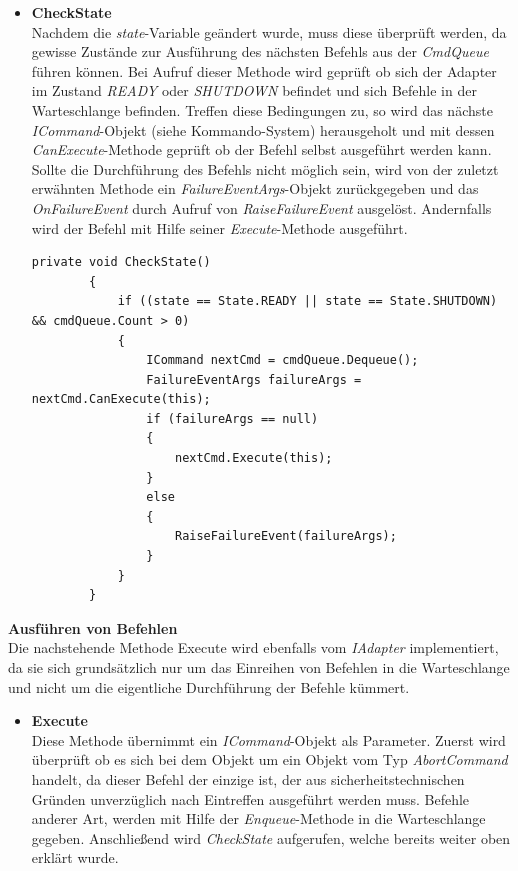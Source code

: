 \begin{itemize}
\item \textbf{CheckState}\\
Nachdem die \textit{state}-Variable geändert wurde, muss diese überprüft werden, da gewisse Zustände zur Ausführung des nächsten Befehls aus der \textit{CmdQueue} führen können. Bei Aufruf dieser Methode wird geprüft ob sich der Adapter im Zustand \textit{READY} oder \textit{SHUTDOWN} befindet und sich Befehle in der Warteschlange befinden. Treffen diese Bedingungen zu, so wird das nächste \textit{ICommand}-Objekt (siehe Kommando-System) herausgeholt und mit dessen \textit{CanExecute}-Methode geprüft ob der Befehl selbst ausgeführt werden kann. \\
Sollte die Durchführung des Befehls nicht möglich sein, wird von der zuletzt erwähnten Methode ein \textit{FailureEventArgs}-Objekt zurückgegeben und das \textit{OnFailureEvent} durch Aufruf von \textit{RaiseFailureEvent} ausgelöst. Andernfalls wird der Befehl mit Hilfe seiner \textit{Execute}-Methode ausgeführt.

\begin{lstlisting}[language = CSharp, captionpos=b, caption={Die CheckState-Methode des IAdapters}]
private void CheckState()
        {
            if ((state == State.READY || state == State.SHUTDOWN) && cmdQueue.Count > 0)
            {
                ICommand nextCmd = cmdQueue.Dequeue();
                FailureEventArgs failureArgs = nextCmd.CanExecute(this);
                if (failureArgs == null)
                {
                    nextCmd.Execute(this);
                }
                else
                {
                    RaiseFailureEvent(failureArgs);
                }
            }
        }
\end{lstlisting}
\end{itemize}

\textbf{Ausführen von Befehlen}\\
Die nachstehende Methode {Execute} wird ebenfalls vom \textit{IAdapter} implementiert, da sie sich grundsätzlich nur um das Einreihen von Befehlen in die Warteschlange und nicht um die eigentliche Durchführung der Befehle kümmert.
\begin{itemize}
\item \textbf{Execute}\\
Diese Methode übernimmt ein \textit{ICommand}-Objekt als Parameter. Zuerst wird überprüft ob es sich bei dem Objekt um ein Objekt vom Typ \textit{AbortCommand} handelt, da dieser Befehl der einzige ist, der aus sicherheitstechnischen Gründen unverzüglich nach Eintreffen ausgeführt werden muss. Befehle anderer Art, werden mit Hilfe der \textit{Enqueue}-Methode in die Warteschlange gegeben. Anschließend wird \textit{CheckState} aufgerufen, welche bereits weiter oben erklärt wurde.\\

\end{itemize}


